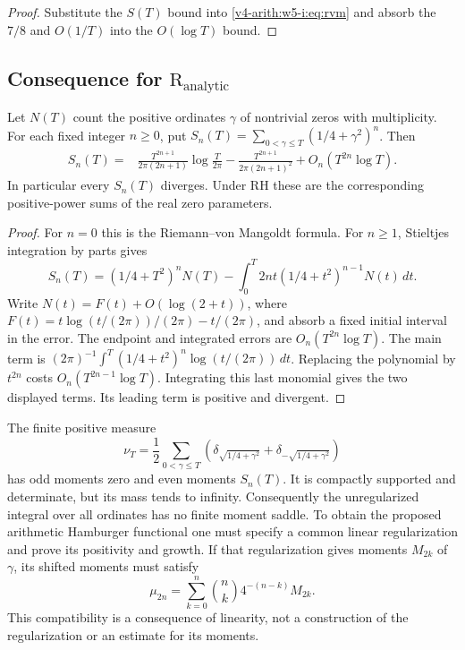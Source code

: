 \begin{proof}
Substitute the \(S(T)\) bound into \eqref{v4-arith:w5-i:eq:rvm} and
absorb the \(7/8\) and \(O(1/T)\) into the \(O(\log T)\) bound.
\end{proof}

\subsection{Consequence for \(\mathrm{R}_{\mathrm{analytic}}\)}
\label{v4-arith:w5-i:R-analytic-closure}

\begin{proposition}
\label{v4-arith:w5-i:prop:R-analytic-density}
Let \(N(T)\) count the positive ordinates \(\gamma\) of nontrivial
zeros with multiplicity. For each fixed integer \(n\geq0\), put
\(S_n(T)=\sum_{0<\gamma\leq T}(1/4+\gamma^2)^n\). Then
\begin{align*}
 S_n(T)={}&\frac{T^{2n+1}}{2\pi(2n+1)}\log\frac{T}{2\pi}
 -\frac{T^{2n+1}}{2\pi(2n+1)^2}
 +O_n(T^{2n}\log T).
\end{align*}
In particular every \(S_n(T)\) diverges. Under RH these are the
corresponding positive-power sums of the real zero parameters.
\end{proposition}
\begin{proof}
For \(n=0\) this is the Riemann--von Mangoldt formula. For
\(n\geq1\), Stieltjes integration by parts gives
\[
 S_n(T)=(1/4+T^2)^nN(T)
 -\int_0^T2nt(1/4+t^2)^{n-1}N(t)\,dt.
\]
Write \(N(t)=F(t)+O(\log(2+t))\), where
\(F(t)=t\log(t/(2\pi))/(2\pi)-t/(2\pi)\), and absorb a fixed
initial interval in the error. The endpoint and integrated errors
are \(O_n(T^{2n}\log T)\). The main term is
\((2\pi)^{-1}\int^T(1/4+t^2)^n\log(t/(2\pi))\,dt\).
Replacing the polynomial by \(t^{2n}\) costs
\(O_n(T^{2n-1}\log T)\). Integrating this last monomial gives
the two displayed terms. Its leading term is positive and divergent.
\end{proof}
\begin{remark}
\label{v4-arith:w5-i:rem:density-closure-domain}
The finite positive measure
\[
 \nu_T=\frac12\sum_{0<\gamma\leq T}
 \left(\delta_{\sqrt{1/4+\gamma^2}}+
       \delta_{-\sqrt{1/4+\gamma^2}}\right)
\]
has odd moments zero and even moments \(S_n(T)\). It is compactly
supported and determinate, but its mass tends to infinity.
Consequently the unregularized integral over all ordinates has no
finite moment saddle. To obtain the proposed arithmetic Hamburger
functional one must specify a common linear regularization and prove
its positivity and growth. If that regularization gives moments
\(M_{2k}\) of \(\gamma\), its shifted moments must satisfy
\[
 \mu_{2n}=\sum_{k=0}^n\binom nk4^{-(n-k)}M_{2k}.
\]
This compatibility is a consequence of linearity, not a construction
of the regularization or an estimate for its moments.
\end{remark}

